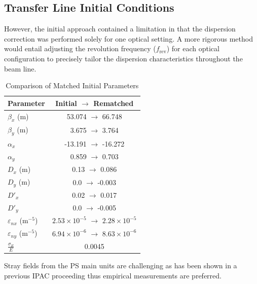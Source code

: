 \documentclass[a4paper,
               biblatex,     %
               ]{jacow}
\begin{document}
\subsection{Transfer Line Initial Conditions}

However, the initial approach contained a limitation in that the dispersion correction was performed solely for one optical setting. A more rigorous method would entail adjusting the revolution frequency ($f_{\text{rev}}$) for each optical configuration to precisely tailor the dispersion characteristics throughout the beam line.

\begin{table}[h!]
    \centering
    \caption{Comparison of Matched Initial Parameters}
    \label{tab:initial_conditions_comparison_single_col}
    \begin{tabular}{l c}
        \hline
        Parameter & Initial \(\rightarrow\) Rematched \\
        \hline
        $\beta_x$ (m) & 53.074 \(\rightarrow\) 66.748 \\
        $\beta_y$ (m) & 3.675 \(\rightarrow\) 3.764 \\
        $\alpha_x$ & -13.191 \(\rightarrow\) -16.272 \\
        $\alpha_y$ & 0.859 \(\rightarrow\) 0.703 \\
        $D_x$ (m) & 0.13 \(\rightarrow\) 0.086 \\
        $D_y$ (m) & 0.0 \(\rightarrow\) -0.003 \\
        $D'_x$ & 0.02 \(\rightarrow\) 0.017 \\
        $D'_y$ & 0.0 \(\rightarrow\) -0.005 \\
        $\varepsilon_{nx}$ ($\text{m}^{-5}$) & $2.53 \times 10^{-5}$ \(\rightarrow\) $2.28 \times 10^{-5}$ \\
        $\varepsilon_{ny}$ ($\text{m}^{-5}$) & $6.94 \times 10^{-6}$ \(\rightarrow\) $8.63 \times 10^{-6}$ \\
        $\frac{\sigma_{E}}{E}$ & 0.0045 \\
        \hline
    \end{tabular}
\end{table}


Stray fields from the PS main units are challenging as has been shown in a previous IPAC proceeding thus empirical measurements are preferred.






\end{document}
